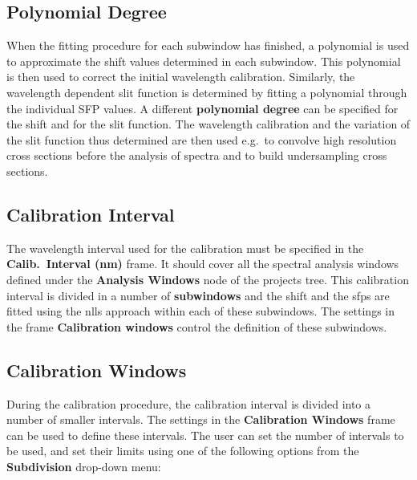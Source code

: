\subsection{Polynomial Degree}
When the fitting procedure for each subwindow has finished, a
polynomial is used to approximate the shift values determined in each
subwindow.  This polynomial is then used to correct the initial
wavelength calibration.  Similarly, the wavelength dependent slit
function is determined by fitting a polynomial through the individual
SFP values. A different \textbf{polynomial degree} can be specified
for the shift and for the slit function.  The wavelength calibration
and the variation of the slit function thus determined are then used
e.g.\ to convolve high resolution cross sections before the analysis
of spectra and to build undersampling cross sections.

\subsection{Calibration Interval}
The wavelength interval used for the calibration must be specified in
the \textbf{Calib.\ Interval (nm)} frame. It should cover all the
spectral analysis windows defined under the \textbf{Analysis Windows}
node of the projects tree. This calibration interval is divided in a
number of \textbf{subwindows} and the shift and the \glspl{sfp} are
fitted using the \gls{nlls} approach within each of these subwindows.
The settings in the frame \textbf{Calibration windows} control the
definition of these subwindows.

\subsection{Calibration Windows}\label{sec:calibration-windows}
During the calibration procedure, the calibration interval is divided
into a number of smaller intervals.  The settings in the \textbf{Calibration
Windows} frame can be used to define these intervals.  The user can
set the number of intervals to be used, and set their limits using one
of the following options from the \textbf{Subdivision} drop-down menu:

